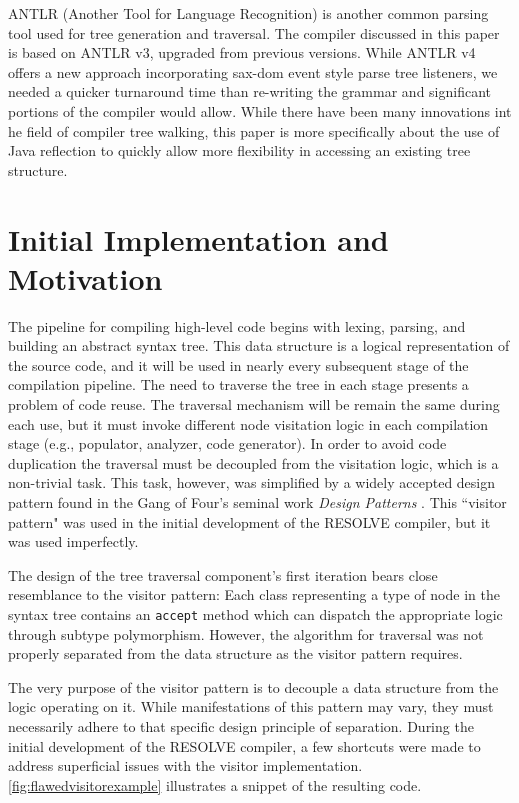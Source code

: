 \documentclass[times]{speauth}
\begin{document}
ANTLR (Another Tool for Language Recognition) is another common parsing tool used for tree generation and traversal. The compiler discussed in this paper is based on ANTLR v3, upgraded from previous versions. While ANTLR v4 offers a new approach incorporating sax-dom event style parse tree listeners, we needed a quicker turnaround time than re-writing the grammar and significant portions of the compiler would allow. While there have been many innovations int he field of compiler tree walking, this paper is more specifically about the use of Java reflection to quickly allow more flexibility in accessing an existing tree structure.


\section{Initial Implementation and Motivation}
The pipeline for compiling high-level code begins with lexing, parsing, and building an abstract syntax tree. This data structure is a logical representation of the source code, and it will be used in nearly every subsequent stage of the compilation pipeline. The need to traverse the tree in each stage presents a problem of code reuse. The traversal mechanism will be remain the same during each use, but it must invoke different node visitation logic in each compilation stage (e.g., populator, analyzer, code generator). In order to avoid code duplication the traversal must be decoupled from the visitation logic, which is a non-trivial task. This task, however, was simplified by a widely accepted design pattern found in the Gang of Four's seminal work \textit{Design Patterns} \cite{gamma:1995}. This ``visitor pattern" was used in the initial development of the RESOLVE compiler, but it was used imperfectly.

The design of the tree traversal component's first iteration bears close resemblance to the visitor pattern: Each class representing a type of node in the syntax tree contains an \texttt{accept} method which can dispatch the appropriate logic through subtype polymorphism. However, the algorithm for traversal was not properly separated from the data structure as the visitor pattern requires.

The very purpose of the visitor pattern is to decouple a data structure from the logic operating on it. While manifestations of this pattern may vary, they must necessarily adhere to that specific design principle of separation. During the initial development of the RESOLVE compiler, a few shortcuts were made to address superficial issues with the visitor implementation. \ref{fig:flawedvisitorexample} illustrates a snippet of the resulting code.
\end{document}

